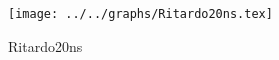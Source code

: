 \begin{figure}[h] \centering\texttt{[image: ../../graphs/Ritardo20ns.tex]}\caption{Ritardo20ns}\label{gr:Ritardo20ns} \end{figure}
